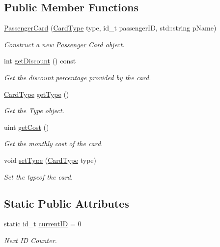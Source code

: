 \subsection*{Public Member Functions}
\begin{DoxyCompactItemize}
\item 
\mbox{\hyperlink{classPassengerCard_a1ebc730da7c0820350024f29c37ce9d9}{Passenger\+Card}} (\mbox{\hyperlink{classPassengerCard_ac30388c823af514403463a797e2878af}{Card\+Type}} type, id\+\_\+t passenger\+ID, std\+::string p\+Name)
\begin{DoxyCompactList}\small\item\em Construct a new \mbox{\hyperlink{classPassenger}{Passenger}} Card object. \end{DoxyCompactList}\item 
int \mbox{\hyperlink{classPassengerCard_a62d2651d233d28643d5e0863500c42c4}{get\+Discount}} () const
\begin{DoxyCompactList}\small\item\em Get the discount percentage provided by the card. \end{DoxyCompactList}\item 
\mbox{\hyperlink{classPassengerCard_ac30388c823af514403463a797e2878af}{Card\+Type}} \mbox{\hyperlink{classPassengerCard_aef682e4bb625ac937c4aec7999c92626}{get\+Type}} ()
\begin{DoxyCompactList}\small\item\em Get the Type object. \end{DoxyCompactList}\item 
uint \mbox{\hyperlink{classPassengerCard_a8428ca4fc3d4c7b4636be628c2fe5aad}{get\+Cost}} ()
\begin{DoxyCompactList}\small\item\em Get the monthly cost of the card. \end{DoxyCompactList}\item 
void \mbox{\hyperlink{classPassengerCard_ab0c4c67f185dc1abee907b6cd50413bf}{set\+Type}} (\mbox{\hyperlink{classPassengerCard_ac30388c823af514403463a797e2878af}{Card\+Type}} type)
\begin{DoxyCompactList}\small\item\em Set the typeof the card. \end{DoxyCompactList}\end{DoxyCompactItemize}
\subsection*{Static Public Attributes}
\begin{DoxyCompactItemize}
\item 
static id\+\_\+t \mbox{\hyperlink{classPassengerCard_af557a01fde14b95c0e0b355e777e2aec}{current\+ID}} = 0
\begin{DoxyCompactList}\small\item\em Next ID Counter. \end{DoxyCompactList}\end{DoxyCompactItemize}


